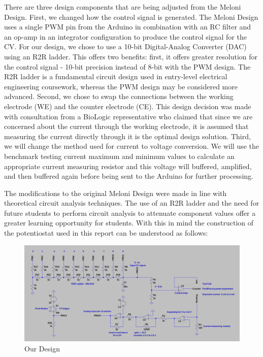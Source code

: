 \documentclass{article}
\begin{document}
There are three design components that are being adjusted from the Meloni Design. First, we changed how the control signal is generated. The Meloni Design uses a single PWM pin from the Arduino in combination with an RC filter and an op-amp in an integrator configuration to produce the control signal for the CV. For our design, we chose to use a 10-bit Digital-Analog Converter (DAC) using an R2R ladder. This offers two benefits: first, it offers greater resolution for the control signal - 10-bit precision instead of 8-bit with the PWM design. The R2R ladder is a fundamental circuit design used in entry-level electrical engineering coursework, whereas the PWM design may be considered more advanced. Second, we chose to swap the connections between the working electrode (WE) and the counter electrode (CE). This design decision was made with consultation from a BioLogic representative who claimed that since we are concerned about the current through the working electrode, it is assumed that measuring the current directly through it is the optimal design solution. Third, we will change the method used for current to voltage conversion. We will use the benchmark testing current maximum and minimum values to calculate an appropriate current measuring resistor and this voltage will buffered, amplified, and then buffered again before being sent to the Arduino for further processing.

The modifications to the original Meloni Design were made in line with theoretical circuit analysis techniques. The use of an R2R ladder and the need for future students to perform circuit analysis to attenuate component values offer a greater learning opportunity for students. With this in mind the construction of the potentiostat used in this report can be understood as follows:

\begin{figure}[H]
    \centering
    \includegraphics[width=.9\linewidth]{diy_design.png}
    \caption{Our Design}
\end{figure}
\end{document}
